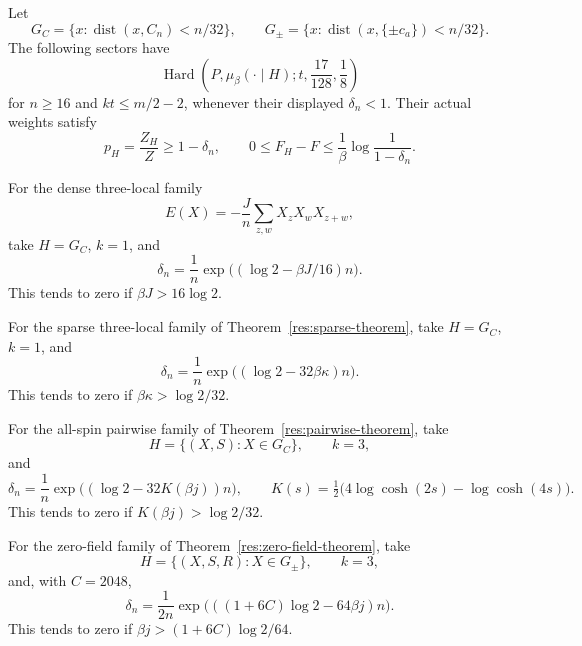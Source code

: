\begin{proposition}
\label{ian:hard-sector-local-instances}
Let
\[
 G_C=\{x:\operatorname{dist}(x,C_n)<n/32\},\qquad
 G_\pm=\{x:\operatorname{dist}(x,\{\pm c_a\})<n/32\}.
\]
The following sectors have
\[
 \operatorname{Hard}\left(
 P,\mu_\beta(\cdot\mid H);
 t,\frac{17}{128},\frac18\right)
\]
for \(n\ge16\) and \(kt\le m/2-2\), whenever their displayed
\(\delta_n<1\). Their actual weights satisfy
\[
 p_H=\frac{Z_H}{Z}\ge1-\delta_n,\qquad
 0\le F_H-F\le\frac1\beta\log\frac1{1-\delta_n}.
\]

For the dense three-local family
\[
 E(X)=-\frac Jn\sum_{z,w}X_zX_wX_{z+w},
\]
take \(H=G_C\), \(k=1\), and
\[
 \delta_n=\frac1n
 \exp\bigl((\log2-\beta J/16)n\bigr).
\]
This tends to zero if \(\beta J>16\log2\).

For the sparse three-local family of
Theorem~\ref{res:sparse-theorem}, take \(H=G_C\), \(k=1\), and
\[
 \delta_n=\frac1n
 \exp\bigl((\log2-32\beta\kappa)n\bigr).
\]
This tends to zero if \(\beta\kappa>\log2/32\).

For the all-spin pairwise family of
Theorem~\ref{res:pairwise-theorem}, take
\[
 H=\{(X,S):X\in G_C\},\qquad k=3,
\]
and
\[
 \delta_n=\frac1n
 \exp\bigl((\log2-32K(\beta j))n\bigr),
 \qquad
 K(s)=\tfrac12\bigl(4\log\cosh(2s)-\log\cosh(4s)\bigr).
\]
This tends to zero if \(K(\beta j)>\log2/32\).

For the zero-field family of
Theorem~\ref{res:zero-field-theorem}, take
\[
 H=\{(X,S,R):X\in G_\pm\},\qquad k=3,
\]
and, with \(C=2048\),
\[
 \delta_n=\frac1{2n}
 \exp\bigl(((1+6C)\log2-64\beta j)n\bigr).
\]
This tends to zero if
\(\beta j>(1+6C)\log2/64\).
\end{proposition}

